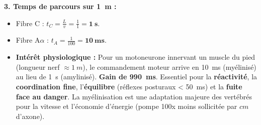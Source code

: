 \documentclass[11pt]{article}
\begin{document}
\begin{exoresolu}
\textbf{3. Temps de parcours sur \SI{1}{m} :}
\begin{itemize}
    \item Fibre C : $t_C = \frac{L}{v} = \frac{1}{1} = \mathbf{\SI{1}{s}}$.
    \item Fibre A$\alpha$ : $t_A = \frac{1}{100} = \mathbf{\SI{10}{ms}}$.
    \item \textbf{Intérêt physiologique :} Pour un motoneurone innervant un muscle du pied (longueur nerf $\approx \SI{1}{m}$), le commandement moteur arrive en \SI{10}{ms} (myélinisé) au lieu de \SI{1}{s} (amylinisé). \textbf{Gain de \SI{990}{ms}}. Essentiel pour la \textbf{réactivité}, la \textbf{coordination fine}, l'\textbf{équilibre} (réflexes posturaux < \SI{50}{ms}) et la \textbf{fuite face au danger}. La myélinisation est une adaptation majeure des vertébrés pour la vitesse et l'économie d'énergie (pompe  100x moins sollicitée par $cm$ d'axone).
\end{itemize}


\end{exoresolu}
\end{document}
